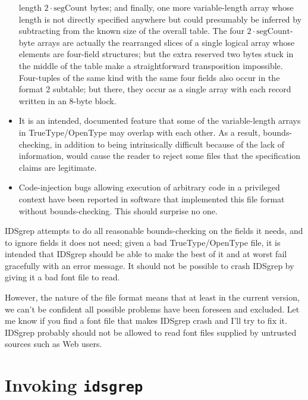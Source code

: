 \documentclass[twocolumn]{report}
\begin{document}
\begin{itemize}
    length $2 \cdot \textrm{segCount}$ bytes; and finally, one more
    variable-length array whose length is not directly specified
    anywhere but could presumably be inferred by subtracting from the
    known size of the overall table. The four $2 \cdot
    \textrm{segCount}$-byte arrays are actually the rearranged slices
    of a single logical array whose elements are four-field
    structures; but the extra reserved two bytes
    stuck in the middle of the table make a straightforward transposition
    impossible.  Four-tuples of the same kind with the same four fields
    also occur in the format 2 subtable; but there, they occur as a single
    array with each record written in an 8-byte block.
  \item It is an intended, documented feature that some of the
    variable-length arrays in TrueType/OpenType may overlap with each other. 
    As a result, bounds-checking, in addition to being intrinsically
    difficult because of the lack of information, would cause the
    reader to reject some files that the specification claims are
    legitimate.
  \item Code-injection bugs allowing execution of arbitrary
    code in a privileged context have been reported in software
    that implemented this file format without bounds-checking.  This should
    surprise no one.
\end{itemize}

IDSgrep attempts to do all reasonable bounds-checking on the fields it
needs, and to ignore fields it does not need; given a bad TrueType/OpenType
file, it is intended that IDSgrep should be able to make the best of it and
at worst fail gracefully with an error message.  It should not be possible
to crash IDSgrep by giving it a bad font file to read.

However, the nature of the file format means that at least in the
current version, we can't be confident all possible problems have
been foreseen and excluded.  Let me know if you find a font file that
makes IDSgrep crash and I'll try to fix it. IDSgrep probably should not be
allowed to read font files supplied by untrusted sources such as Web
users.


\chapter{Invoking \texttt{idsgrep}}
\end{document}
